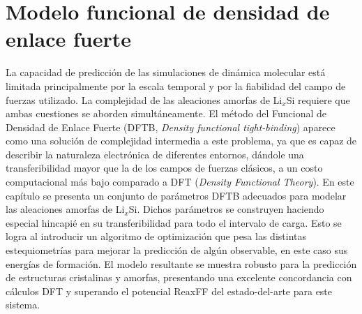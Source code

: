 \chapter{Modelo funcional de densidad de enlace fuerte}\label{ch:modelo}
\thispagestyle{empty}

\vspace{50pt}

\begin{adjustwidth}{50pt}{50pt}
    La capacidad de predicción de las simulaciones de dinámica molecular está 
    limitada principalmente por la escala temporal y por la fiabilidad del campo
    de fuerzas utilizado. La complejidad de las aleaciones amorfas de Li$_x$Si 
    requiere que ambas cuestiones se aborden simultáneamente. El método del 
    Funcional de Densidad de Enlace Fuerte (DFTB, \textit{Density functional 
    tight-binding}) aparece como una solución de complejidad intermedia a este
    problema, ya que es capaz de describir la naturaleza electrónica de diferentes 
    entornos, dándole una transferibilidad mayor que la de los campos de fuerzas clásicos, 
    a un costo computacional más bajo comparado a DFT (\textit{Density Functional
    Theory}). En este capítulo se presenta un conjunto de parámetros DFTB adecuados
    para modelar las aleaciones amorfas de Li$_x$Si. Dichos parámetros se 
    construyen haciendo especial hincapié en su transferibilidad para todo el 
    intervalo de carga. Esto se logra al introducir un algoritmo de optimización 
    que pesa las distintas estequiometrías para mejorar la predicción de algún 
    observable, en este caso sus energías de formación. El modelo resultante se 
    muestra robusto para la predicción de estructuras cristalinas y amorfas, 
    presentando una excelente concordancia con cálculos DFT y superando el 
    potencial ReaxFF del estado-del-arte para este sistema.
\end{adjustwidth}

\clearpage
\newpage
\thispagestyle{empty}
\mbox{}
\newpage








